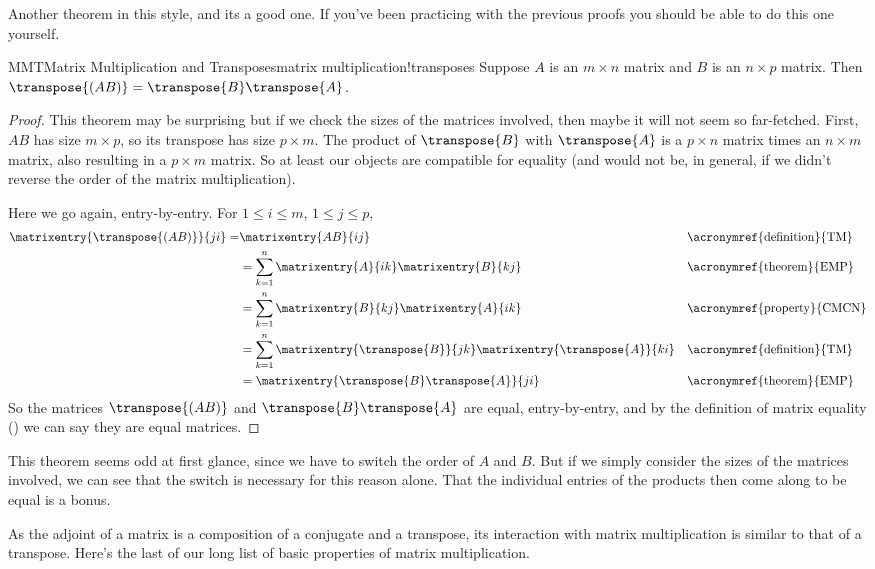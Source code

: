 %
Another theorem in this style, and its a good one.  If you've been practicing with the previous proofs you should be able to do this one yourself.
%
\begin{theorem}{MMT}{Matrix Multiplication and Transposes}{matrix multiplication!transposes}
Suppose $A$ is an $m\times n$ matrix and $B$ is an $n\times p$ matrix.  Then $\transpose{(AB)}=\transpose{B}\transpose{A}$.
\end{theorem}
%
\begin{proof}
This theorem may be surprising but if we check the sizes of the matrices involved, then maybe it will not seem so far-fetched.  First, $AB$ has size $m\times p$, so its transpose has size $p\times m$.  The product of $\transpose{B}$ with $\transpose{A}$ is a $p\times n$ matrix times an $n\times m$ matrix, also resulting in a $p\times m$ matrix.  So at least our objects are compatible for equality (and would not be, in general, if we didn't reverse the order of the matrix multiplication).\par
%
Here we go again, entry-by-entry.  For $1\leq i\leq m$, $1\leq j\leq p$,
%
\begin{align*}
\matrixentry{\transpose{(AB)}}{ji}=&\matrixentry{AB}{ij}
&&\text{\acronymref{definition}{TM}}\\
%
&=\sum_{k=1}^{n}\matrixentry{A}{ik}\matrixentry{B}{kj}
&&\text{\acronymref{theorem}{EMP}}\\
%
&=\sum_{k=1}^{n}\matrixentry{B}{kj}\matrixentry{A}{ik}
&&\text{\acronymref{property}{CMCN}}\\
%
&=\sum_{k=1}^{n}\matrixentry{\transpose{B}}{jk}\matrixentry{\transpose{A}}{ki}
&&\text{\acronymref{definition}{TM}}\\
%
&=\matrixentry{\transpose{B}\transpose{A}}{ji}
&&\text{\acronymref{theorem}{EMP}}
%
\end{align*}
%
So the matrices $\transpose{(AB)}$ and $\transpose{B}\transpose{A}$ are equal, entry-by-entry, and by the definition of matrix equality () we can say they are equal matrices.
%
\end{proof}
%
This theorem seems odd at first glance, since we have to switch the order of $A$ and $B$.  But if we simply consider the sizes of the matrices involved, we can see that the switch is necessary for this reason alone.  That the individual entries of the products then come along to be equal is a bonus.\par
%
As the adjoint of a matrix is a composition of a conjugate and a transpose, its interaction with matrix multiplication is similar to that of a transpose.  Here's the last of our long list of basic properties of matrix multiplication.
